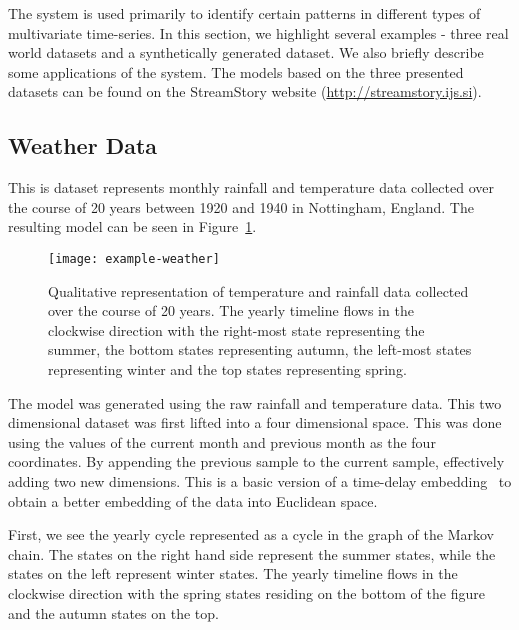The system is used primarily to identify certain patterns in different types of multivariate time-series. In this section, we highlight several examples -  three real world datasets and a synthetically generated dataset.  We also briefly describe some applications of the system.  The models based on the three presented datasets can be found on the StreamStory website (\url{http://streamstory.ijs.si}). 



\subsection{Weather Data}
\label{sec:experiments-weather}
This is dataset represents monthly rainfall and temperature data
collected over the course of 20 years between 1920 and 1940 in Nottingham, England\cite{}. 
The resulting model can be seen in Figure~\ref{fig:example-weather}. 

\begin{figure}[h!]
	\centering
	\texttt{[image: example-weather]}
	\caption{Qualitative representation of temperature and rainfall data collected over the course of 20 years. The yearly timeline flows in the clockwise direction with the right-most state representing the summer, the bottom states representing autumn, the left-most states representing winter and the top states representing spring.}
	\label{fig:example-weather}
\end{figure}

The model was generated using the raw rainfall and temperature data. This two dimensional dataset was first  lifted into a four dimensional space. This was done using the values of the current month and previous month as the four coordinates.
By appending the previous sample to the current sample, effectively adding two new dimensions. This is a basic version of a time-delay embedding~\cite{} to obtain a better embedding of the data into Euclidean space.

First, we see the yearly cycle represented as a cycle in the graph of the Markov chain. 
The states on the right hand side represent the 
summer states, while the states on the left represent winter states. The yearly timeline flows in the clockwise direction with the spring states residing on the bottom of the figure and the autumn
states on the top.

